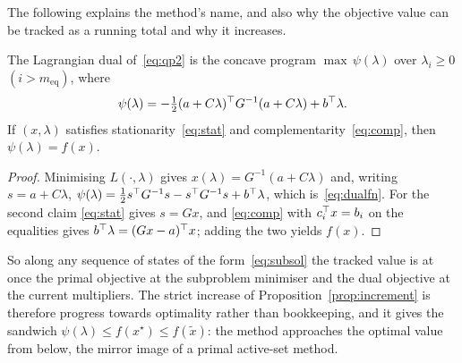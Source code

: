 The following explains the method's name, and also why the objective value can be
tracked as a running total and why it increases.

\begin{proposition}\label{prop:dual}
The Lagrangian dual of~\eqref{eq:qp2} is the concave program
$\max\,\psi(\lambda)$ over $\lambda_i \ge 0$ $(i > m_{\mathrm{eq}})$, where
\begin{equation}
  \psi(\lambda) = -\tfrac12 (a + C\lambda)^{\top} G^{-1} (a + C\lambda) + b^{\top}\lambda .
  \label{eq:dualfn}
\end{equation}
If $(x,\lambda)$ satisfies stationarity~\eqref{eq:stat} and
complementarity~\eqref{eq:comp}, then $\psi(\lambda) = f(x)$.
\end{proposition}

\begin{proof}
Minimising $L(\cdot,\lambda)$ gives $x(\lambda) = G^{-1}(a + C\lambda)$ and,
writing $s = a + C\lambda$, $\psi(\lambda) = \tfrac12 s^{\top} G^{-1}s - s^{\top} G^{-1}s +
b^{\top}\lambda$, which is~\eqref{eq:dualfn}. For the second claim \eqref{eq:stat}
gives $s = Gx$, and \eqref{eq:comp} with $c_i^{\top} x = b_i$ on the equalities gives
$b^{\top}\lambda = (Gx - a)^{\top} x$; adding the two yields $f(x)$.
\end{proof}

So along any sequence of states of the form~\eqref{eq:subsol} the tracked value is
at once the primal objective at the subproblem minimiser and the dual objective at
the current multipliers. The strict increase of Proposition~\ref{prop:increment}
is therefore progress towards optimality rather than bookkeeping, and it gives
the sandwich
$\psi(\lambda) \le f(x^\star) \le f(\tilde x)$: the method approaches the optimal
value from below, the mirror image of a primal active-set method.
